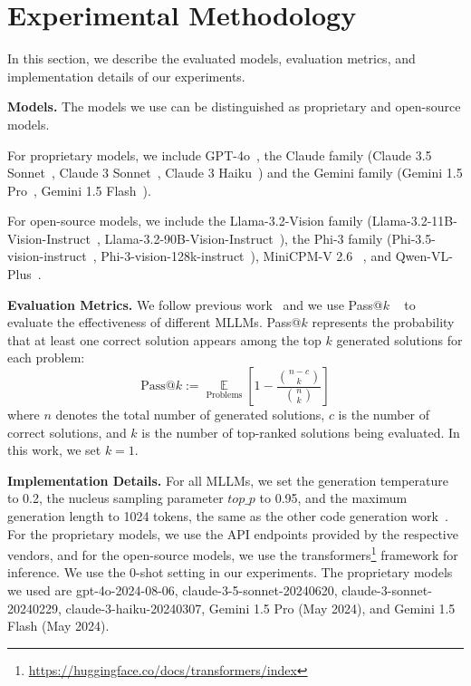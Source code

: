 \section{Experimental Methodology}
In this section, we describe the evaluated models, evaluation metrics, and implementation details of our experiments.



\textbf{Models. }
The models we use can be distinguished as proprietary and open-source models.

For proprietary models, we include GPT-4o~\cite{gpt4o}, the Claude family (Claude 3.5 Sonnet~\cite{Claude3.5_Sonnet}, Claude 3 Sonnet~\cite{Claude3}, Claude 3 Haiku~\cite{Claude3}) and the Gemini family (Gemini 1.5 Pro~\cite{geminiteam2024gemini15unlockingmultimodal}, Gemini 1.5 Flash~\cite{geminiteam2024gemini15unlockingmultimodal}).

For open-source models, we include the Llama-3.2-Vision family (Llama-3.2-11B-Vision-Instruct~\cite{Llama3.2}, Llama-3.2-90B-Vision-Instruct~\cite{Llama3.2}), the Phi-3 family (Phi-3.5-vision-instruct~\cite{abdin2024phi3technicalreporthighly}, Phi-3-vision-128k-instruct~\cite{abdin2024phi3technicalreporthighly}), MiniCPM-V 2.6~\cite{yao2024minicpmvgpt4vlevelmllm} , and Qwen-VL-Plus~\cite{bai2023qwenvlversatilevisionlanguagemodel}.

\textbf{Evaluation Metrics. }
We follow previous work~\cite{chen2021evaluatinglargelanguagemodels,li2024mmcode,wang2024intervenor,yang2024enhancing,luo2023wizardcoder} and we use Pass@$k$ ~\cite{chen2021evaluatinglargelanguagemodels} to evaluate the effectiveness of different MLLMs. Pass@$k$ represents the probability that at least one correct solution appears among the top $k$ generated solutions for each problem:
\begin{equation}
    \text{Pass@}k:=\underset{\text{Problems}}{\operatorname*{\mathbb{E}}}\left[1-\frac{\binom{n-c}k}{\binom nk}\right]
\end{equation}
where $n$ denotes the total number of generated solutions, $c$ is the number of correct solutions, and $k$ is the number of top-ranked solutions being evaluated. In this work, we set $k=1$.




\textbf{Implementation Details. } 
For all MLLMs, we set the generation temperature to 0.2, the nucleus sampling parameter $top\_p$ to 0.95, and the maximum generation length to 1024 tokens, the same as the other code generation work~\cite{hui2024qwen25codertechnicalreport,zheng2024opencodeinterpreter,guo2024deepseek,zhu2024deepseek}. For the proprietary models, we use the API endpoints provided by the respective vendors, and for the open-source models, we use the transformers\footnote{\url{https://huggingface.co/docs/transformers/index}} framework for inference. We use the 0-shot setting in our experiments. The proprietary models we used are gpt-4o-2024-08-06, claude-3-5-sonnet-20240620, claude-3-sonnet-20240229, claude-3-haiku-20240307, Gemini 1.5 Pro (May 2024), and Gemini 1.5 Flash (May 2024).


